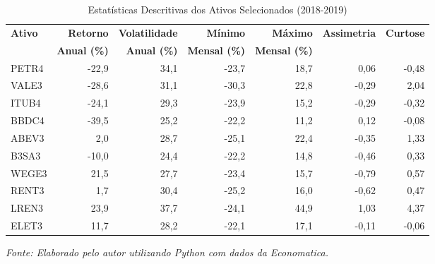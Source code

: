 \begin{table}[H]
\centering
\caption{Estatísticas Descritivas dos Ativos Selecionados (2018-2019)}
\begin{tabular}{|l|r|r|r|r|r|r|}
\hline
\textbf{Ativo} & \textbf{Retorno} & \textbf{Volatilidade} & \textbf{Mínimo} & \textbf{Máximo} & \textbf{Assimetria} & \textbf{Curtose} \\
& \textbf{Anual (\%)} & \textbf{Anual (\%)} & \textbf{Mensal (\%)} & \textbf{Mensal (\%)} & & \\
\hline
PETR4 & -22,9 & 34,1 & -23,7 & 18,7 & 0,06 & -0,48 \\
\hline
VALE3 & -28,6 & 31,1 & -30,3 & 22,8 & -0,29 & 2,04 \\
\hline
ITUB4 & -24,1 & 29,3 & -23,9 & 15,2 & -0,29 & -0,32 \\
\hline
BBDC4 & -39,5 & 25,2 & -22,2 & 11,2 & 0,12 & -0,08 \\
\hline
ABEV3 & 2,0 & 28,7 & -25,1 & 22,4 & -0,35 & 1,33 \\
\hline
B3SA3 & -10,0 & 24,4 & -22,2 & 14,8 & -0,46 & 0,33 \\
\hline
WEGE3 & 21,5 & 27,7 & -23,4 & 15,7 & -0,79 & 0,57 \\
\hline
RENT3 & 1,7 & 30,4 & -25,2 & 16,0 & -0,62 & 0,47 \\
\hline
LREN3 & 23,9 & 37,7 & -24,1 & 44,9 & 1,03 & 4,37 \\
\hline
ELET3 & 11,7 & 28,2 & -22,1 & 17,1 & -0,11 & -0,06 \\
\hline
\end{tabular}

\textit{Fonte: Elaborado pelo autor utilizando Python com dados da Economatica.}
\label{tab:descriptive_stats}
\end{table}
